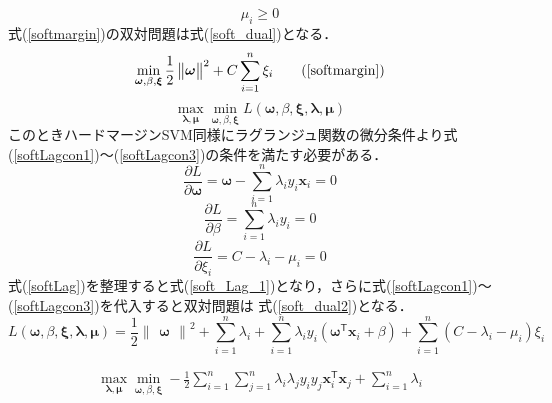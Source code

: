 \documentclass[11pt,a4paper,titlepage]{ltjsarticle}
\begin{document}
\begin{equation}
    \label{softcon6}
    \mu_i\geq0
\end{equation}
式(\ref{softmargin})の双対問題は式(\ref{soft_dual})となる．
\begin{equation}
        \min_{\bm{\omega},\beta,\bm{\xi}}\frac{1}{2}\begin{Vmatrix}\bm{\omega}\end{Vmatrix}^2 + C\sum_{i=1}^{n}\xi_i \tag{\ref{softmargin}}
\end{equation}
\begin{equation}
    \label{soft_dual}
    \max_{\bm{\lambda},\bm{\mu}}\min_{\bm{\omega},\beta,\bm{\xi}}L(\bm{\omega},\beta,\bm{\xi},\bm{\lambda},\bm{\mu})
\end{equation}
このときハードマージンSVM同様にラグランジュ関数の微分条件より式(\ref{softLagcon1})～(\ref{softLagcon3})の条件を満たす必要がある．
\begin{equation}
    \label{softLagcon1}
    \frac{\partial L}{\partial \bm{\omega}} = \bm{\omega}-\sum_{i=1}^{n}\lambda_i y_i\bm{x}_i = 0
\end{equation}
\begin{equation}
    \label{softLagcon2}
    \frac{\partial L}{\partial \beta} = \sum_{i=1}^{n}\lambda_iy_i = 0
\end{equation}
\begin{equation}
    \label{softLagcon3}
    \frac{\partial L}{\partial \xi_i} = C - \lambda_i - \mu_i = 0
\end{equation}
式(\ref{softLag})を整理すると式(\ref{soft_Lag_1})となり，さらに式(\ref{softLagcon1})～(\ref{softLagcon3})を代入すると双対問題は
式(\ref{soft_dual2})となる．
\begin{equation}
    \label{soft_Lag_1}
    L(\bm{\omega},\beta,\bm{\xi},\bm{\lambda},\bm{\mu}) = \frac{1}{2}\begin{Vmatrix}\bm{\omega}\end{Vmatrix}^2  + \sum_{i=1}^{n}\lambda_i + \sum_{i=1}^{n}\lambda_iy_i(\bm{\omega}^\mathsf{T}\bm{x}_i + \beta)+\sum_{i=1}^{n}(C - \lambda_i - \mu_i)\xi_i
\end{equation}

\begin{equation}
    \label{soft_dual2}
    \begin{gathered}
        \max_{\bm{\lambda},\bm{\mu}}\min_{\bm{\omega},\beta,\bm{\xi}}-\frac{1}{2}\sum_{i=1}^{n}\sum_{j=1}^{n}\lambda_i\lambda_j y_i y_j \bm{x}_i^\mathsf{T}\bm{x}_j+\sum_{i=1}^{n}\lambda_i\\
    \end{gathered}
\end{equation}
\end{document}
